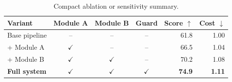\begin{table}[t]
\centering
\caption{Compact ablation or sensitivity summary.}
\label{tab:compact-ablation-or-sensitivity}
\small
\setlength{\tabcolsep}{4pt}
\renewcommand{\arraystretch}{1.08}
\begin{tabular}{@{}lccc rr@{}}
\toprule
\rowcolor{TableHeaderTint}
\textbf{Variant} & \textbf{Module A} & \textbf{Module B} & \textbf{Guard} &
\textbf{Score $\uparrow$} & \textbf{Cost $\downarrow$} \\
\midrule
Base pipeline & -- & -- & -- & 61.8 & 1.00 \\
+ Module A & $\checkmark$ & -- & -- & 66.5 & 1.04 \\
+ Module B & $\checkmark$ & $\checkmark$ & -- & 70.2 & 1.08 \\
\midrule
\rowcolor{TableFocusTint}
\textbf{Full system} & $\checkmark$ & $\checkmark$ & $\checkmark$ &
\textbf{74.9} & \textbf{1.11} \\
\bottomrule
\end{tabular}
\end{table}
